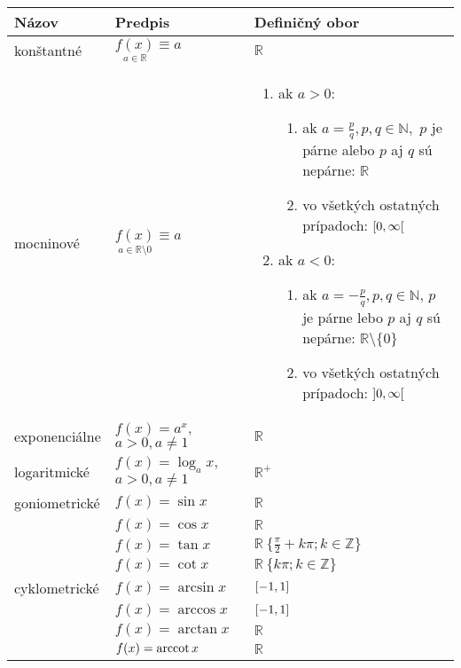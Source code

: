\noindent
\begin{tabular}{|p{}|p{}|p{}|}
  \hline
  \textbf{Názov} & \textbf{Predpis} & \textbf{Definičný obor} \\
  \hline
  konštantné &
  $\underset{a \in \mathbb{R}}{f(x)}\equiv a$ \footnotemark[1] & $\mathbb{R}$ \\
  mocninové &
  $\underset{a \in \mathbb{R} \setminus {0}}{f(x)}\equiv a$ &
  \begin{enumerate}[leftmargin=0.5cm]
    \item ak $a>0$:
      \begin{enumerate}[leftmargin=0.5cm]
        \item ak $a=\frac{p}{q},p,q\in\mathbb{N},$ $p$ je párne alebo $p$ aj $q$
              sú nepárne: $\mathbb{R}$
        \item vo všetkých ostatných prípadoch: $\interval[open right]{0}{\infty}$
      \end{enumerate}
    \item ak $a<0$:
      \begin{enumerate}[leftmargin=0.5cm]
        \item ak $a=-\frac{p}{q},p,q\in\mathbb{N}$, $p$ je párne lebo $p$ aj $q$
              sú nepárne: $\mathbb{R} \setminus \{0\}$
        \item vo všetkých ostatných prípadoch: $\interval[open]{0}{\infty}$
      \end{enumerate}
  \end{enumerate}
  \\
  exponenciálne
    & $f(x)=a^x, $\newline$ a>0,a\neq 1$
    & $\mathbb{R}$ \\
  logaritmické
    & $f(x)=\log_a x,$\newline$ a>0,a\neq 1$ \footnotemark[2] & $\mathbb{R}^{+}$ \\
  goniometrické & $f(x)=\sin x$ & $\mathbb{R}$ \\
    & $f(x)=\cos x$ & $\mathbb{R}$ \\
    & $f(x)=\tan x$ & $\mathbb{R}\ \{\frac{\pi}{2}+k\pi;k\in\mathbb{Z}\}$ \\
    & $f(x)=\cot x$ & $\mathbb{R}\ \{k\pi;k\in\mathbb{Z}\}$ \\
  cyklometrické \footnotemark[3]
    & $f(x)=\arcsin x$ & $\interval{-1}{1}$ \\
    & $f(x)=\arccos x$ & $\interval{-1}{1}$ \\
    & $f(x)=\arctan x$ & $\mathbb{R}$ \\
    & $f(x)=\operatorname{arccot} x$ & $\mathbb{R}$ \\
  \hline
\end{tabular}

